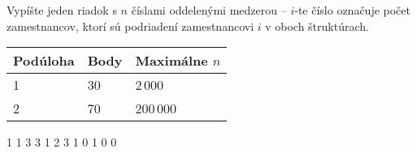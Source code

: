 
Vypíšte jeden riadok s $n$ číslami oddelenými medzerou -- $i$-te číslo označuje počet
zamestnancov, ktorí sú podriadení zamestnancovi $i$ v oboch štruktúrach.


\centering
\begin{tabular}{|l|l|l|}
\hline
Podúloha & Body & Maximálne $n$  \\ \hline
1       & 30     & 2\,000          \\ \hline
2       & 70     & 200\,000        \\ \hline
\end{tabular}


1 1 3 3
1 2 3 1
 0 1 0 0 

\sampleEND


